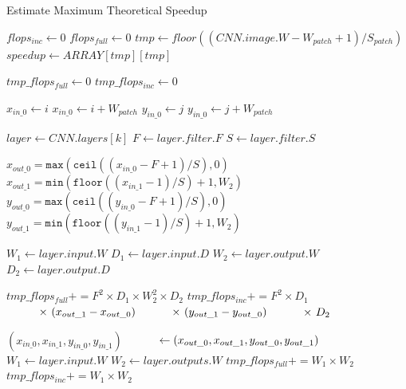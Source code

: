 \begin{algorithm}
\caption{Estimate Maximum Theoretical Speedup}\label{alg:max-speedup}
\begin{algorithmic}[1]
\State $flops_{inc} \gets 0$
\State $flops_{full} \gets 0$
\State $tmp \gets floor((CNN.image.W-W_{patch}+1)/S_{patch})$
\State $speedup \gets ARRAY[tmp][tmp]$

      \State $tmp\_flops_{full} \gets 0$
      \State $tmp\_flops_{inc} \gets 0$
      
      \State $x_{in\_0} \gets i$
      \State $x_{in\_0} \gets i + W_{patch}$
      \State $y_{in\_0} \gets j$
      \State $y_{in\_0} \gets j + W_{patch}$

          \State $layer \gets CNN.layers[k]$
            \State $F \gets layer.filter.F$
            \State $S \gets layer.filter.S$
            
            \State $x_{out\_0} = \texttt{max}(\texttt{ceil}((x_{in\_0} - F + 1)/S), 0)$
            \State $x_{out\_1} = \texttt{min}(\texttt{floor}((x_{in\_1} - 1)/S) + 1, W_2)$
            \State $y_{out\_0} = \texttt{max}(\texttt{ceil}((y_{in\_0} - F + 1)/S), 0)$
            \State $y_{out\_1} = \texttt{min}(\texttt{floor}((y_{in\_1} - 1)/S) + 1, W_2)$

              \State $W_1 \gets layer.input.W$
              \State $D_1 \gets layer.input.D$
              \State $W_2 \gets layer.output.W$
              \State $D_2 \gets layer.output.D$

              \State $tmp\_flops_{full} \mathrel{{+}{=}} F^2 \times D_1\times W_2^2\times D_2$
              \State $tmp\_flops_{inc} \mathrel{{+}{=}} F^2 \times D_1$
              \State $\hspace{10mm} \times ~(x_{out\_1} - x_{out\_0})$
              \State $\hspace{10mm} \times ~(y_{out\_1} - y_{out\_0})$
              \State $\hspace{10mm} \times ~D_2$
            \EndIf

            \State $(x_{in\_0}, x_{in\_1}, y_{in\_0}, y_{in\_1})$
            \State $\hspace{10mm} \gets (x_{out\_0}, x_{out\_1}, y_{out\_0}, y_{out\_1})$
            \State $W_1 \gets layer.input.W$
            \State $W_2 \gets layer.outputs.W$
            \State $tmp\_flops_{full} \mathrel{{+}{=}} W_1 \times W_2$
            \State $tmp\_flops_{inc} \mathrel{{+}{=}} W_1 \times W_2$
          \EndIf
      \EndFor


\end{algorithmic}
\end{algorithm}
